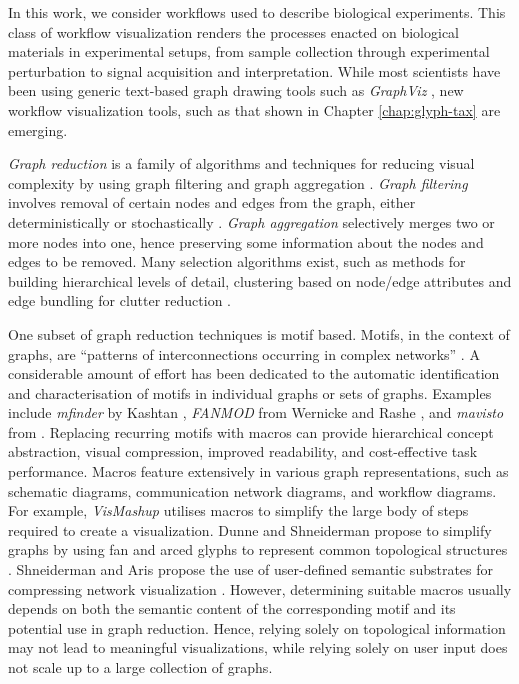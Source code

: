 In this work, we consider workflows used to describe biological experiments.
This class of workflow visualization renders the processes
enacted on biological materials in experimental setups, from sample collection through experimental perturbation to signal acquisition and interpretation.
While most scientists have been using generic text-based graph drawing tools such as \emph{GraphViz} \cite{GraphViz::2012}, new workflow visualization tools, such as that shown in Chapter \ref{chap:glyph-tax} are emerging. 

\emph{Graph reduction} is a family of algorithms and techniques for reducing visual complexity by using graph filtering and graph aggregation \cite{landesberger11}.
\emph{Graph filtering} involves removal of certain nodes and edges from the graph, either deterministically or stochastically \cite{leskovec06,landesberger11}.
\emph{Graph aggregation} selectively merges two or more nodes into one, hence preserving some information about the nodes and edges to be removed.
Many selection algorithms exist, such as methods for building hierarchical levels of detail, clustering based on node/edge attributes and edge bundling for clutter reduction \cite{landesberger11,holten06}.

One subset of graph reduction techniques is motif based.
Motifs, in the context of graphs, are ``patterns of interconnections occurring in complex networks'' \cite{Milo:2002,Pavlopoulos:2011}.
A considerable amount of effort has been dedicated to the automatic identification and characterisation of motifs in individual graphs or sets of graphs.
Examples include \emph{mfinder} by Kashtan \etal \cite{kashtan04}, \emph{FANMOD} from Wernicke and Rashe \cite{wernicke06}, and \emph{mavisto} from \cite{schreiber05}.
Replacing recurring motifs with macros can provide hierarchical concept abstraction, visual compression, improved readability, and cost-effective task performance.
Macros feature extensively in various graph representations, such as schematic diagrams, communication network diagrams, and workflow diagrams.
For example, \emph{VisMashup} \cite{santosvismashup:2009} utilises macros to simplify the large body of steps required to create a visualization.
Dunne and Shneiderman propose to simplify graphs by using fan and arced glyphs to represent common topological structures \cite{dunnemotif2012}.
Shneiderman and Aris propose the use of user-defined semantic substrates for compressing network visualization \cite{Shneiderman:2006:TVCG}. 
However, determining suitable macros usually depends on both the semantic content of the corresponding motif and its potential use in graph reduction.
Hence, relying solely on topological information may not lead to meaningful visualizations, while relying solely on user input does not scale up to a large collection of graphs.

